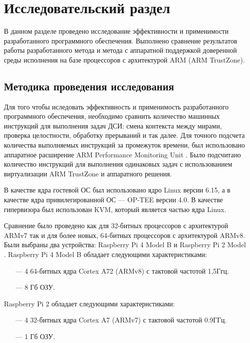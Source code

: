 \section{Исследовательский раздел}

В данном разделе проведено исследование эффективности и применимости разработанного программного обеспечения. Выполнено сравнение результатов работы разработанного метода и метода с аппаратной поддержкой доверенной среды исполнения на базе процессоров с архитектурой ARM (ARM TrustZone).

\subsection{Методика проведения исследования}

Для того чтобы иследовать эффективность и применимость разработанного программного обеспечения, необходимо сравнить количество машинных инструкций для выполнения задач ДСИ: смена контекста между мирами, проверка целостности, обработку прерываний и так далее. Для точного подсчета количества выполняемых инструкций за промежуток времени, был использовано аппаратное расширение ARM Performance Monitoring Unit \cite{arm-performance-monitor}. Было подсчитано количество инструкций для выполнения одинаковых задач с использованием виртуализации ARM TrustZone и аппаратного решения.

В качестве ядра гостевой ОС был использовано ядро Linux версии 6.15, а в качестве ядра привилегированной ОС --- OP-TEE версии 4.0. В качестве гипервизора был использован KVM, который является частью ядра Linux.

Сравнение было проведено как для 32-битных процессоров с архитектурой ARMv7 так и для более новых, 64-битных процессоров с архитектурой ARMv8. Были выбраны два устройства: Raspberry Pi 4 Model B \cite{rpi4-b} и Raspberry Pi 2 Model \cite{rpi2-b}. Raspberry Pi 4 Model B обладает следующими характеристиками:

\begin{itemize}
	\item [---] 4 64-битных ядра Cortex A72 (ARMv8) с тактовой частотой 1,5Ггц.
	\item [---] 8 Гб ОЗУ.
\end{itemize}

Raspberry Pi 2 обладает следующими характеристиками:

\begin{itemize}
	\item [---] 4 32-битных ядра Cortex A7 (ARMv7) с тактовой частотой 0.9ГГц.
	\item [---] 1 Гб ОЗУ.
\end{itemize}

